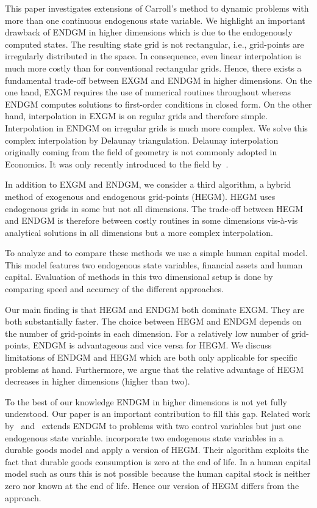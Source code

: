 \documentclass[a4paper,12pt]{article}
\begin{document}
This paper investigates extensions of Carroll's method to dynamic problems with more than one continuous endogenous state variable. We highlight an important drawback of ENDGM in higher dimensions which is due to the endogenously computed states. The resulting state grid is not rectangular, i.e., grid-points are irregularly distributed in the space. In consequence, even linear interpolation is much more costly than for conventional rectangular grids. Hence, there exists a fundamental trade-off between EXGM and ENDGM in higher dimensions. On the one hand, EXGM requires the use of numerical routines throughout whereas ENDGM computes solutions to first-order conditions in closed form. On the other hand, interpolation in EXGM is on regular grids and therefore simple. Interpolation in ENDGM on irregular grids is much more complex. We solve this complex interpolation by Delaunay triangulation. Delaunay interpolation originally coming from the field of geometry is not commonly adopted in Economics. It was only recently introduced to the field by~.

In addition to EXGM and ENDGM, we consider a third algorithm, a hybrid method of exogenous and endogenous grid-points (HEGM). HEGM uses endogenous grids in some but not all dimensions. The trade-off between HEGM and ENDGM is therefore between costly routines in some dimensions vis-\`{a}-vis analytical solutions in all dimensions but a more complex interpolation.

To analyze and to compare these methods we use a simple human capital model. This model features two endogenous state variables, financial assets and human capital. Evaluation of methods in this two dimensional setup is done by comparing speed and accuracy of the different approaches.

Our main finding is that HEGM and ENDGM both dominate EXGM. They are both substantially faster. The choice between HEGM and ENDGM depends on the number of grid-points in each dimension. For a relatively low number of grid-points, ENDGM is advantageous and vice versa for HEGM. We discuss limitations of ENDGM and HEGM which are both only applicable for specific problems at hand. Furthermore, we argue that the relative advantage of HEGM decreases in higher dimensions (higher than two).

To the best of our knowledge ENDGM in higher dimensions is not yet fully understood. Our paper is an important contribution to fill this gap. Related work by~ and~ extends ENDGM to problems with two control variables but just one endogenous state variable.  incorporate two endogenous state variables in a durable goods model and apply a version of HEGM. Their algorithm exploits the fact that durable goods consumption is zero at the end of life. In a human capital model such as ours this is not possible because the human capital stock is neither zero nor known at the end of life. Hence our version of HEGM differs from the  approach.
\end{document}
